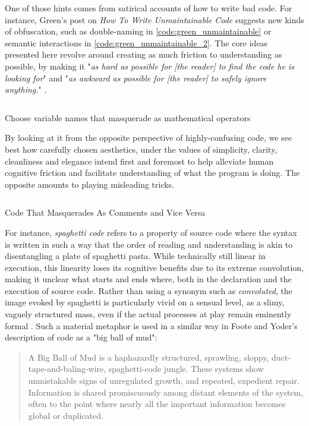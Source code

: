 One of those hints comes from satirical accounts of how to write bad code. For instance, Green's post on \emph{How To Write Unmaintainable Code} suggests new kinds of obfuscation, such as double-naming in \autoref{code:green_unmaintainable} or semantic interactions in \autoref{code:green_unmaintainable_2}. The core ideas presented here revolve around creating as much friction to understanding as possible, by making it "\emph{as hard as possible for [the reader] to find the code he is looking for}" and "\emph{as awkward as possible for [the reader] to safely ignore anything.}" \citep{green_how_2006}.

\begin{listing}
  \inputminted{python}{./corpus/unmaintainable.py}
  \caption{Choose variable names that masquerade as mathematical operators}
  \label{code:green_unmaintainable}
\end{listing}

By looking at it from the opposite perspective of highly-confusing code, we see best how carefully chosen aesthetics, under the values of simplicity, clarity, cleanliness and elegance intend first and foremost to help alleviate human cognitive friction and facilitate understanding of what the program is doing. The opposite amounts to playing misleading tricks.

\begin{listing}
  \inputminted{c}{./corpus/unmaintainable_2.c}
  \caption{Code That Masquerades As Comments and Vice Versa}
  \label{code:green_unmaintainable_2}
\end{listing}

For instance, \emph{spaghetti code} refers to a property of source code where the syntax is written in such a way that the order of reading and understanding is akin to disentangling a plate of spaghetti pasta. While technically still linear in execution, this linearity loses its cognitive benefits due to its extreme convolution, making it unclear what starts and ends where, both in the declaration and the execution of source code. Rather than using a synonym such as \emph{convoluted}, the image evoked by spaghetti is particularly vivid on a sensual level, as a slimy, vaguely structured mass, even if the actual processes at play remain eminently formal \citep{steele_macaroni_1977}. Such a material metaphor is used in a similar way in Foote and Yoder's description of code as a "big ball of mud":

\begin{quote}
  A Big Ball of Mud is a haphazardly structured, sprawling, sloppy, duct-tape-and-baling-wire, spaghetti-code jungle. These systems show unmistakable signs of unregulated growth, and repeated, expedient repair. Information is shared promiscuously among distant elements of the system, often to the point where nearly all the important information becomes global or duplicated. \citep{foote_big_1997}
\end{quote}

